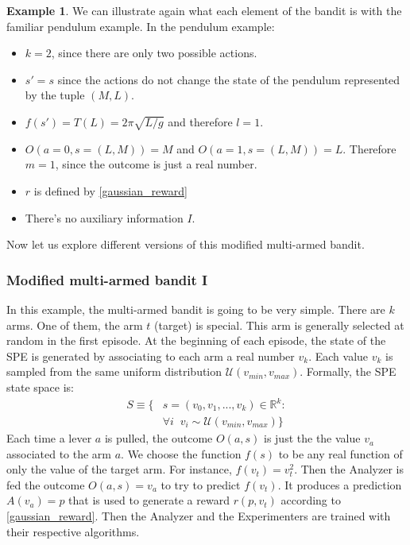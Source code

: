 \documentclass[11pt,a4paper,twoside]{report}
\newcommand{\+}{\textnormal{+} }
\theoremstyle{definition}
\newtheorem{myex}[mythm]{Example}
\numberwithin{equation}{chapter}
\begin{document}
\begin{myex}
  We can illustrate again what each element of the bandit is with the familiar
  pendulum example. In the pendulum example:
  \begin{itemize}
    \item $k=2$, since there are only two possible actions.
    \item $s'=s$ since the actions do not change the state of the pendulum 
    represented by the tuple $(M,L)$.
    \item $f(s')=T(L)=2\pi\sqrt{L/g}$ and therefore $l=1$.
    \item $O(a=0,s=(L,M))=M$ and $O(a=1, s=(L,M))=L$. Therefore $m=1$, since 
    the outcome is just a real number.
    \item $r$ is defined by \eqref{gaussian_reward}
    \item There's no auxiliary information $I$.
  \end{itemize}
  
\end{myex}

Now let us explore different versions of this modified multi-armed bandit.

\subsubsection{Modified multi-armed bandit I}

  In this example, the multi-armed bandit is going to be very simple. There are
  $k$ arms. One of them, the arm $t$ (target) is special. This arm is generally
  selected at random in the first episode. At the beginning of each episode, the
  state of the SPE is generated by associating to each arm a real number $v_k$.
  Each value $v_k$ is sampled from the same uniform distribution
  $\mathcal{U}(v_{min},v_{max})$. Formally, the SPE state space is:
  \begin{align}
    S\equiv\{&s=(v_0, v_1,...,v_k) \in \mathbb{R}^k: \\
    & \forall i \; \; v_i \sim \mathcal{U}(v_{min},v_{max})
    \}
  \end{align}
  Each time a lever $a$ is pulled, the outcome $O(a,s)$ is just the the value
  $v_a$ associated to the arm $a$. We choose the function $f(s)$ to be any real
  function of only the value of the target arm. For instance, $f(v_t)=v_t^2$.
  Then the Analyzer is fed the outcome $O(a,s)=v_a$ to try to predict $f(v_t)$.
  It produces a prediction $A(v_a)=p$ that is used to generate a reward
  $r(p,v_t)$ according to \eqref{gaussian_reward}. Then the Analyzer and the
  Experimenters are trained with their respective algorithms.
\end{document}
